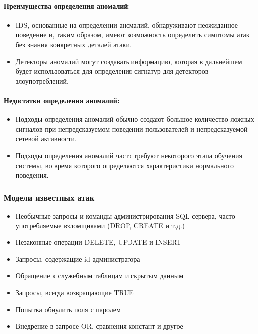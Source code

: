 \paragraph*{Преимущества определения аномалий:}

\begin{itemize}
	\item IDS, основанные на определении аномалий, обнаруживают неожиданное поведение и, таким образом, имеют возможность определить симптомы атак без знания конкретных деталей атаки.
	\item Детекторы аномалий могут создавать информацию, которая в дальнейшем будет использоваться для определения сигнатур для детекторов злоупотреблений.
\end{itemize}


\paragraph*{Недостатки определения аномалий:}

\begin{itemize}
	\item Подходы определения аномалий обычно создают большое количество ложных сигналов при непредсказуемом поведении пользователей и непредсказуемой сетевой активности.
	\item Подходы определения аномалий часто требуют некоторого этапа обучения системы, во время которого определяются характеристики нормального поведения.
\end{itemize}



\subsubsection{Модели известных атак}

\begin{itemize}
	\item Необычные запросы и команды администрирования SQL сервера, часто употребляемые 
	взломщиками (DROP, CREATE и т.д.)
	\item Незаконные операции DELETE, UPDATE и INSERT
	\item Запросы, содержащие id администратора
	\item Обращение к служебным таблицам и скрытым данным
	\item Запросы, всегда возвращающие TRUE
	\item Попытка обнулить поля с паролем
	\item Внедрение в запросе OR, сравнения констант и другое
\end{itemize}



